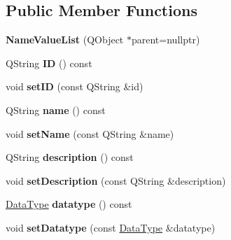 \subsection*{Public Member Functions}
\begin{DoxyCompactItemize}
\item 
\mbox{\label{class_name_value_list_a9853fd971e4de03634e1db4588527d4e}} 
{\bfseries Name\+Value\+List} (Q\+Object $\ast$parent=nullptr)
\item 
\mbox{\label{class_name_value_list_a1245be184ee740d835b6dbb9309fab31}} 
Q\+String {\bfseries ID} () const
\item 
\mbox{\label{class_name_value_list_a3b06e0602dadf415db5a64931503bfc2}} 
void {\bfseries set\+ID} (const Q\+String \&id)
\item 
\mbox{\label{class_name_value_list_af86da6b7d27a467e646916015ef1cdca}} 
Q\+String {\bfseries name} () const
\item 
\mbox{\label{class_name_value_list_a484e4394aafa989d94da042c68174d4a}} 
void {\bfseries set\+Name} (const Q\+String \&name)
\item 
\mbox{\label{class_name_value_list_a1a5ac02dcd6ef00dfce8054639ea9815}} 
Q\+String {\bfseries description} () const
\item 
\mbox{\label{class_name_value_list_aa2f41da8e4ca7dabf02780c569f4850f}} 
void {\bfseries set\+Description} (const Q\+String \&description)
\item 
\mbox{\label{class_name_value_list_ae8961d6c7d33894b2ba1061b6c78c492}} 
\hyperlink{class_data_type}{Data\+Type} {\bfseries datatype} () const
\item 
\mbox{\label{class_name_value_list_abebe412c10f91731a73d43b2262ddabb}} 
void {\bfseries set\+Datatype} (const \hyperlink{class_data_type}{Data\+Type} \&datatype)
\item 
\mbox{\label{class_name_value_list_a2afba4fbcf8658de872018abc2beedcb}} 

\end{DoxyCompactItemize}
